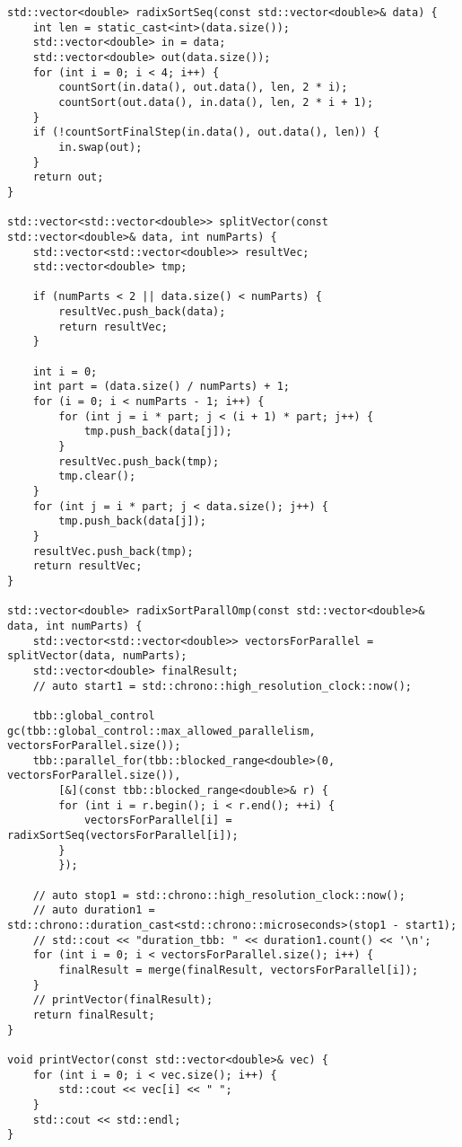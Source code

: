 \documentclass{article}
\begin{document}
\begin{verbatim}
std::vector<double> radixSortSeq(const std::vector<double>& data) {
    int len = static_cast<int>(data.size());
    std::vector<double> in = data;
    std::vector<double> out(data.size());
    for (int i = 0; i < 4; i++) {
        countSort(in.data(), out.data(), len, 2 * i);
        countSort(out.data(), in.data(), len, 2 * i + 1);
    }
    if (!countSortFinalStep(in.data(), out.data(), len)) {
        in.swap(out);
    }
    return out;
}

std::vector<std::vector<double>> splitVector(const std::vector<double>& data, int numParts) {
    std::vector<std::vector<double>> resultVec;
    std::vector<double> tmp;

    if (numParts < 2 || data.size() < numParts) {
        resultVec.push_back(data);
        return resultVec;
    }

    int i = 0;
    int part = (data.size() / numParts) + 1;
    for (i = 0; i < numParts - 1; i++) {
        for (int j = i * part; j < (i + 1) * part; j++) {
            tmp.push_back(data[j]);
        }
        resultVec.push_back(tmp);
        tmp.clear();
    }
    for (int j = i * part; j < data.size(); j++) {
        tmp.push_back(data[j]);
    }
    resultVec.push_back(tmp);
    return resultVec;
}

std::vector<double> radixSortParallOmp(const std::vector<double>& data, int numParts) {
    std::vector<std::vector<double>> vectorsForParallel = splitVector(data, numParts);
    std::vector<double> finalResult;
    // auto start1 = std::chrono::high_resolution_clock::now();

    tbb::global_control gc(tbb::global_control::max_allowed_parallelism, vectorsForParallel.size());
    tbb::parallel_for(tbb::blocked_range<double>(0, vectorsForParallel.size()),
        [&](const tbb::blocked_range<double>& r) {
        for (int i = r.begin(); i < r.end(); ++i) {
            vectorsForParallel[i] = radixSortSeq(vectorsForParallel[i]);
        }
        });

    // auto stop1 = std::chrono::high_resolution_clock::now();
    // auto duration1 = std::chrono::duration_cast<std::chrono::microseconds>(stop1 - start1);
    // std::cout << "duration_tbb: " << duration1.count() << '\n';
    for (int i = 0; i < vectorsForParallel.size(); i++) {
        finalResult = merge(finalResult, vectorsForParallel[i]);
    }
    // printVector(finalResult);
    return finalResult;
}

void printVector(const std::vector<double>& vec) {
    for (int i = 0; i < vec.size(); i++) {
        std::cout << vec[i] << " ";
    }
    std::cout << std::endl;
}


\end{verbatim}
\end{document}
